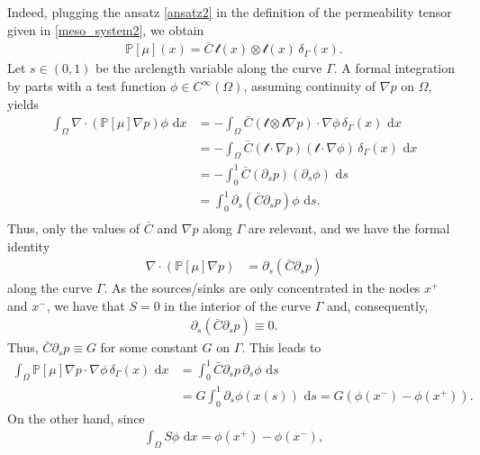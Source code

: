 \documentclass{article}
\numberwithin{equation}{section}
\def\d{\,\mathrm{d}}
\begin{document}
Indeed, plugging the ansatz \eqref{ansatz2} in the definition of the permeability tensor given in \eqref{meso_system2}, we obtain
\begin{align}\label{perm_measure}
\mathbb{P}[\mu](x)= \bar{C} \, \mathcal{t}(x)\otimes \mathcal{t}(x) \, \delta_\Gamma(x).
\end{align}
Let $s\in(0,1)$ be the arclength variable along the curve $\Gamma$.
A formal integration by parts with a test function $\phi\in C^\infty(\Omega)$,
assuming continuity of $\nabla p$ on $\Omega$, yields
\begin{align*}
   \int_\Omega \nabla \cdot (\mathbb{P}[\mu] \nabla p)\phi \, \d x
      &= -\int_\Omega \bar{C} (\mathcal{t}\otimes \mathcal{t} \nabla p)\cdot \nabla \phi \, \delta_\Gamma(x)\,\d x \\
      &=-\int_\Omega \bar{C} (\mathcal{t} \cdot \nabla p) (\mathcal{t} \cdot \nabla \phi) \,\delta_\Gamma(x)\, \d x\\
      &=-\int_0^1 \bar{C} (\partial_s p) (\partial_s \phi) \, \d s\\
      &= \int_0^1 \partial_s (\bar{C}\partial_s p) \phi \, \d s.\\
\end{align*}
Thus, only the values of $\bar{C}$ and $\nabla p$ along $\Gamma$ are relevant, and we have the formal identity
\begin{align}\label{equ2}
\nabla \cdot (\mathbb{P}[\mu] \nabla p) &= \partial_s (\bar{C}\partial _s p)
\end{align}
along the curve $\Gamma$.
As the sources/sinks are only concentrated in the nodes $x^+$ and $x^-$,
we have that $S=0$ in the interior of the curve $\Gamma$ and, consequently,
\begin{align*}
   \partial_{s}(\bar{C} \partial_{s} p) \equiv 0.
\end{align*}
Thus, $\bar{C} \partial_{s} p\equiv G$ for some constant $G$ on $\Gamma$. This leads to
\begin{align*}
   \int_\Omega \mathbb{P}[\mu] \nabla p \cdot \nabla \phi \,\delta_\Gamma(x)\, \d x
   &= \int_0^1 \bar{C} \partial_s p \, \partial_s \phi \,\d s\\
   &= G \int_0^1 \partial_s \phi(x(s))\, \d s = G(\phi(x^-)-\phi(x^+)).
\end{align*}
On the other hand, since
\begin{align*}
   \int_\Omega S\phi\, \d x = \phi(x^+) - \phi(x^-),
\end{align*}
\end{document}
